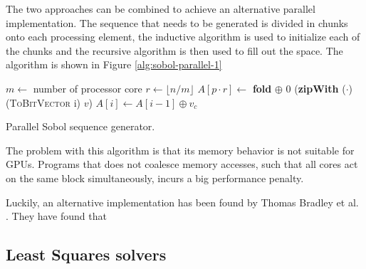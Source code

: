 The two approaches can be combined to achieve an alternative parallel
implementation. The sequence that needs to be generated is divided in
chunks onto each processing element, the inductive algorithm is used
to initialize each of the chunks and the recursive algorithm is then
used to fill out the space. The algorithm is shown in Figure \ref{alg:sobol-parallel-1}

\begin{algorithm}
  \begin{algorithmic}
    \State $m \gets$ number of processor core
    \State $r \gets \lfloor n/m \rfloor$
    \State $A[p\cdot r] \gets$ \textbf{fold} $\oplus$ 0 (\textbf{zipWith} ($\cdot$) (\textsc{ToBitVector} i) $v$)
    \State $A[i] \gets A[i - 1] \oplus v_c$ 
    \EndFor
    \EndParFor
    \EndFunction
  \end{algorithmic}
  \caption{Parallel Sobol sequence generator.}
  \label{alg:sobol-parallel-1}
\end{algorithm}

The problem with this algorithm is that its memory behavior is not
suitable for GPUs. Programs that does not coalesce memory accesses,
such that all cores act on the same block simultaneously, incurs a big
performance penalty. 

Luckily, an alternative implementation has been found by Thomas
Bradley et al. . They have found that \todo{}


\subsection{Least Squares solvers}

